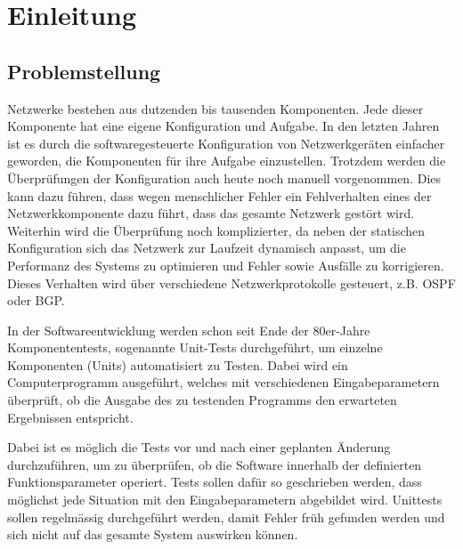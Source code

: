 \documentclass[]{subfiles}
\begin{document}
    \section{Einleitung}
    \subsection{Problemstellung}
    Netzwerke bestehen aus dutzenden bis tausenden Komponenten. 
    Jede dieser Komponente hat eine eigene Konfiguration und Aufgabe.
    In den letzten Jahren ist es durch die softwaregesteuerte Konfiguration
    von Netzwerkgeräten einfacher geworden, die Komponenten für ihre
    Aufgabe einzustellen. Trotzdem werden die Überprüfungen der Konfiguration 
    auch heute noch manuell vorgenommen. Dies kann dazu führen, dass wegen menschlicher
    Fehler ein Fehlverhalten eines der Netzwerkkomponente dazu führt,
    dass das gesamte Netzwerk gestört wird. 
    Weiterhin wird die Überprüfung noch komplizierter, da neben der statischen 
    Konfiguration sich das Netzwerk zur Laufzeit dynamisch anpasst, 
    um die Performanz des Systems zu optimieren und Fehler sowie Ausfälle
    zu korrigieren. 
    Dieses Verhalten wird über verschiedene Netzwerkprotokolle gesteuert, z.B. OSPF oder
    BGP.
    
    In der Softwareentwicklung werden schon seit 
    Ende der 80er-Jahre Komponententests, sogenannte Unit-Tests durchgeführt, um einzelne 
    Komponenten (Units) automatisiert zu Testen. Dabei wird ein Computerprogramm ausgeführt,
    welches mit verschiedenen Eingabeparametern überprüft, ob die Ausgabe des zu testenden
    Programms den erwarteten Ergebnissen entspricht.

    Dabei ist es möglich die Tests vor und nach einer geplanten Änderung durchzuführen,
    um zu überprüfen, ob die Software innerhalb der definierten Funktionsparameter operiert.
    Tests sollen dafür so geschrieben werden, dass möglichst jede Situation mit den 
    Eingabeparametern abgebildet wird. Unittests sollen regelmässig durchgeführt werden,
    damit Fehler früh gefunden werden und sich nicht auf das gesamte System auswirken können.

    \newpage
    
\end{document}
